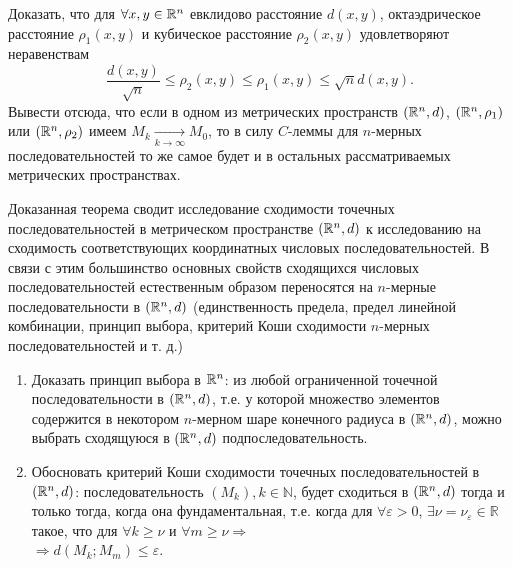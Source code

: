 \begin{exercise}
	Доказать, что для $\forall x, y \in \mathbb{R}^n$ евклидово расстояние $d(x, y)$, октаэдрическое
	расстояние $\rho_1(x, y)$ и кубическое расстояние $\rho_2(x, y)$ удовлетворяют неравенствам
	\begin{equation*}
		\dfrac{d(x, y)}{\sqrt{n}} \leqslant \rho_2(x, y) \leqslant \rho_1(x, y)
		\leqslant \sqrt{n} d(x, y).
	\end{equation*}
	Вывести отсюда, что если в одном из метрических пространств $(\mathbb{R}^n, d)$, $(\mathbb{R}^n, \rho_1)$ или
	$(\mathbb{R}^n, \rho_2)$ имеем $M_k \xrightarrow[k \to \infty]{} M_0$, то в силу $C$-леммы для
	$n$-мерных последовательностей то же самое будет и в остальных рассматриваемых метрических пространствах.
\end{exercise}

\begin{note}
    Доказанная теорема сводит исследование сходимости точечных последовательностей в метрическом
пространстве $(\mathbb{R}^n, d)$ к исследованию на сходимость соответствующих координатных числовых
последовательностей. В связи с этим большинство основных свойств сходящихся числовых последовательностей
естественным образом переносятся на $n$-мерные последовательности в $(\mathbb{R}^n, d)$ (единственность
предела, предел линейной комбинации, принцип выбора, критерий Коши сходимости $n$-мерных
последовательностей и т. д.)
\end{note}

\begin{exercise}
	\begin{enumerate}
	  \item Доказать принцип выбора в $\mathbb{R}^n$: из любой ограниченной точечной последовательности
		в $(\mathbb{R}^n, d)$, т.е. у которой множество элементов содержится в некотором $n$-мерном шаре
		конечного радиуса в $(\mathbb{R}^n, d)$, можно выбрать сходящуюся в $(\mathbb{R}^n, d)$ подпоследовательность.
	  \item Обосновать критерий Коши сходимости точечных последовательностей в $(\mathbb{R}^n, d)$: последовательность $(M_k), k \in \mathbb{N}$, будет сходиться в $(\mathbb{R}^n, d)$ тогда и только тогда, когда она фундаментальная, т.е. когда для ${\forall \varepsilon > 0}$,
		${\exists \nu = \nu_{\varepsilon}\in \mathbb{R}}$ такое, что для ${\forall k \geqslant \nu}$ и
		$\forall m \geqslant \nu \Rightarrow $ \\ $\Rightarrow d(M_k; M_m) \leqslant \varepsilon$.
	\end{enumerate}
\end{exercise}

